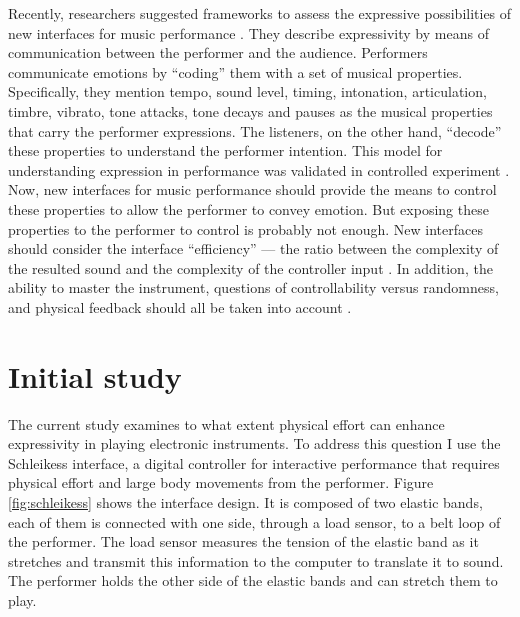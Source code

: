 \documentclass{sigchi}
\begin{document}
Recently, researchers suggested frameworks to assess the expressive possibilities of new interfaces for music performance \cite{Poepel2005}.
They describe expressivity by means of communication between the performer and the audience.
Performers communicate emotions by ``coding'' them with a set of musical properties.
Specifically, they mention tempo, sound level, timing, intonation, articulation, timbre, vibrato, tone attacks, tone decays and pauses as the musical properties that carry the performer expressions.
The listeners, on the other hand, ``decode'' these properties to understand the performer intention.
This model for understanding expression in performance was validated in controlled experiment \cite{Gabrielsson1996}.
Now, new interfaces for music performance should provide the means to control these properties to allow the performer to convey emotion.
But exposing these properties to the performer to control is probably not enough.
New interfaces should consider the interface ``efficiency'' --- the ratio between the complexity of the resulted sound and the complexity of the controller input \cite{Jorda2004}.
In addition, the ability to master the instrument, questions of controllability versus randomness, and physical feedback should all be taken into account \cite{Dobrian2006}.

\section{Initial study}

The current study examines to what extent physical effort can enhance expressivity in playing electronic instruments.
To address this question I use the Schleikess interface, a digital controller for interactive performance that requires physical effort and large body movements from the performer.
Figure \ref{fig:schleikess} shows the interface design.
It is composed of two elastic bands, each of them is connected with one side, through a load sensor, to a belt loop of the performer.
The load sensor measures the tension of the elastic band as it stretches and transmit this information to the computer to translate it to sound.
The performer holds the other side of the elastic bands and can stretch them to play.
\end{document}
